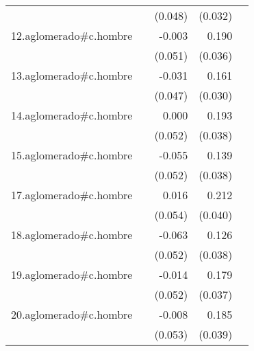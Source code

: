 {\begin{longtable}{l*{4}{D{.}{.}{-1}}}
            &                     &     (0.048)         &     (0.032)         &                     \\
\addlinespace
12.aglomerado#c.hombre&                     &      -0.003         &       0.190\sym{***}&                     \\
            &                     &     (0.051)         &     (0.036)         &                     \\
\addlinespace
13.aglomerado#c.hombre&                     &      -0.031         &       0.161\sym{***}&                     \\
            &                     &     (0.047)         &     (0.030)         &                     \\
\addlinespace
14.aglomerado#c.hombre&                     &       0.000         &       0.193\sym{***}&                     \\
            &                     &     (0.052)         &     (0.038)         &                     \\
\addlinespace
15.aglomerado#c.hombre&                     &      -0.055         &       0.139\sym{***}&                     \\
            &                     &     (0.052)         &     (0.038)         &                     \\
\addlinespace
17.aglomerado#c.hombre&                     &       0.016         &       0.212\sym{***}&                     \\
            &                     &     (0.054)         &     (0.040)         &                     \\
\addlinespace
18.aglomerado#c.hombre&                     &      -0.063         &       0.126\sym{***}&                     \\
            &                     &     (0.052)         &     (0.038)         &                     \\
\addlinespace
19.aglomerado#c.hombre&                     &      -0.014         &       0.179\sym{***}&                     \\
            &                     &     (0.052)         &     (0.037)         &                     \\
\addlinespace
20.aglomerado#c.hombre&                     &      -0.008         &       0.185\sym{***}&                     \\
            &                     &     (0.053)         &     (0.039)         &                     \\

\end{longtable}}
